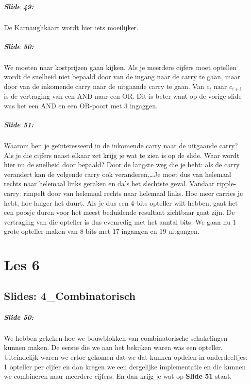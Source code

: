 \documentclass[10pt,a4paper]{book}
\begin{document}
\paragraph{Slide 49:} De Karnaughkaart wordt hier iets moeilijker.

\paragraph{Slide 50:} We moeten naar kostprijzen gaan kijken. Als je meerdere cijfers moet optellen wordt de snelheid niet bepaald door van de ingang naar de carry te gaan, maar door van de inkomende carry naar de uitgaande carry te gaan. Van $c_i$ naar $c_{i+1}$ is de vertraging van een AND naar een OR. Dit is beter want op de vorige slide was het een AND en een OR-poort met 3 ingaggen.

\paragraph{Slide 51:} Waarom ben je ge\"interesseerd in de inkomende carry naar de uitgaande carry? Als je die cijfers naast elkaar zet krijg je wat te zien is op de slide. Waar wordt hier nu de snelheid door bepaald? Door de langste weg die je hebt: als de carry verandert kan de volgende carry ook veranderen,\ldots Je moet dus van helemaal rechts naar helemaal links geraken en da's het slechtste geval. Vandaar ripple-carry: rimpelt door van helemaal rechts naar helemaal links. Hoe meer carries je hebt, hoe langer het duurt. Als je dus een 4-bits opteller wilt hebben, gaat het een poosje duren voor het meest beduidende resultaat zichtbaar gaat zijn. De vertraging van die opteller is dus evenredig met het aantal bits. We gaan nu 1 grote opteller maken van 8 bits met 17 ingangen en 19 uitgangen.

\chapter{Les 6}

\section{Slides: 4\_Combinatorisch}

\paragraph{Slide 50:} We hebben gekeken hoe we bouwblokken van combinatorische schakelingen kunnen maken. De eerste die we aan het bekijken waren was een opteller. Uiteindelijk waren we ertoe gekomen dat we dat kunnen opdelen in onderdeeltjes: 1 opteller per cijfer en dan kregen we een dergelijke implementatie en die kunnen we combineren naar meerdere cijfers. En dan krijg je wat op \textbf{Slide 51} staat.
\end{document}
